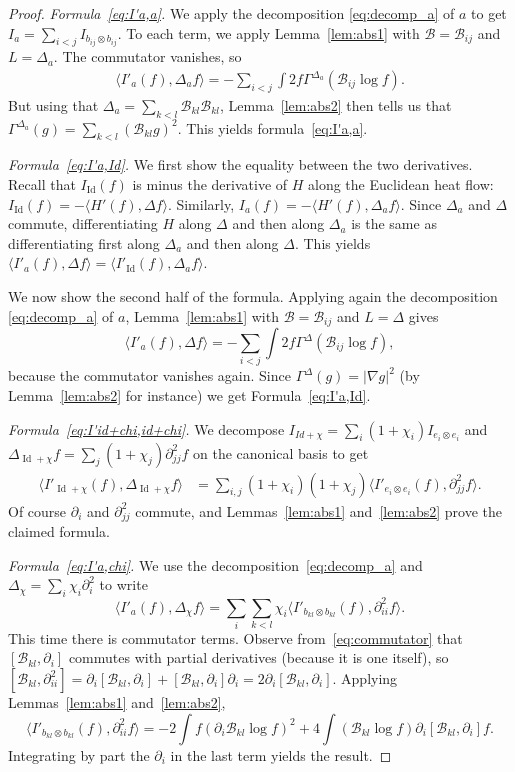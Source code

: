 \documentclass[11pt,a4paper]{article}
\theoremstyle{definition}
\theoremstyle{plain}
\DeclareMathOperator*{\Id}{Id}
\newcommand{\jap}[1]{\langle #1 \rangle}
\begin{document}
\begin{proof}
\textit{Formula~\eqref{eq:I'a,a}.} We apply the decomposition \eqref{eq:decomp_a} of $a$ to get $I_a=\sum_{i<j} I_{b_{ij}\otimes b_{ij}}$. To each term, we apply Lemma~\ref{lem:abs1} with $\mathcal{B}=\mathcal{B}_{ij}$ and $L=\Delta_a$. The commutator vanishes, so
\begin{align*}
    \jap{I'_{a}(f),\Delta_a f} =-\sum_{i<j}\int 2f\Gamma^{\Delta_a}(\mathcal{B}_{ij} \log f ).
\end{align*}
But using that $\Delta_a=\sum_{k<l}\mathcal{B}_{kl}\mathcal{B}_{kl}$, Lemma~\ref{lem:abs2} then tells us that $\Gamma^{\Delta_a}(g ) =\sum_{k<l}(\mathcal{B}_{kl}g)^2 $. This yields formula~\eqref{eq:I'a,a}.

\textit{Formula~\eqref{eq:I'a,Id}.}
We first show the equality between the two derivatives. Recall that $I_{\Id} (f)$ is minus the derivative of $H$ along the Euclidean heat flow: $I_{\Id} (f) = -\jap{H'(f),\Delta f}$. Similarly, $I_a(f)=-\jap{H'(f), \Delta_a f}$. Since $\Delta_a$ and $\Delta$ commute, differentiating $H$ along $\Delta$ and then along $\Delta_a$ is the same as differentiating first along $\Delta_a$ and then along $\Delta$. This yields $\jap{I'_{a}(f),\Delta f}=\jap{I'_{\Id}(f),\Delta_a f}$.

We now show the second half of the formula. Applying again the decomposition \eqref{eq:decomp_a} of $a$, Lemma~\ref{lem:abs1} with $\mathcal{B}=\mathcal{B}_{ij}$ and $L=\Delta$ gives
$$\jap{I'_{a}(f),\Delta f} = -\sum_{i<j}\int 2f \Gamma^\Delta(\mathcal{B}_{ij} \log f ),$$
because the commutator vanishes again. Since $\Gamma^\Delta(g)=\vert \nabla g\vert^2$ (by Lemma~\ref{lem:abs2} for instance) we get Formula~\eqref{eq:I'a,Id}.

\textit{Formula~\eqref{eq:I'id+chi,id+chi}.} 
We decompose $I_{Id+\chi}=\sum_i (1+\chi_i) I_{e_i\otimes e_i}$ and $\Delta_{\Id+\chi} f =\sum_j (1+\chi_j)\partial_{jj}^2f$ on the canonical basis to get
\begin{align*}
    \jap{I'_{\Id+\chi}(f),\Delta_{\Id+\chi} f}&=\sum_{i,j}(1+\chi_i)(1+\chi_j)\jap{I'_{e_i\otimes e_i}(f),\partial^2_{jj} f}.
\end{align*}
Of course $\partial_i$ and $\partial_{jj}^2$ commute, and Lemmas~\ref{lem:abs1} and~\ref{lem:abs2} prove the claimed formula.

\textit{Formula~\eqref{eq:I'a,chi}.} We use the decomposition~\eqref{eq:decomp_a} and $\Delta_\chi=\sum_i \chi_i\partial^2_i$ to write
    $$\jap{I'_a(f),\Delta_\chi f} = \sum_i \sum_{k<l} \chi_i \jap{I'_{b_{kl}\otimes b_{kl}}(f),\partial^2_{ii} f}.$$
This time there is commutator terms. Observe from~\eqref{eq:commutator} that $[\mathcal{B}_{kl},\partial_i]$ commutes with partial derivatives (because it is one itself), so $[\mathcal{B}_{kl},\partial^2_{ii}]=\partial_i[\mathcal{B}_{kl},\partial_{i}]+[\mathcal{B}_{kl},\partial_{i}]\partial_i=2\partial_i[\mathcal{B}_{kl},\partial_{i}]$. Applying Lemmas~\ref{lem:abs1} and~\ref{lem:abs2},
$$\jap{I'_{b_{kl}\otimes b_{kl}}(f),\partial^2_{ii} f}=-2\int f(\partial_i \mathcal{B}_{kl} \log f)^2 +4 \int (\mathcal{B}_{kl} \log f)\partial_i[\mathcal{B}_{kl},\partial_{i}] f.$$
Integrating by part the $\partial_i$ in the last term yields the result.
\end{proof}
\end{document}
